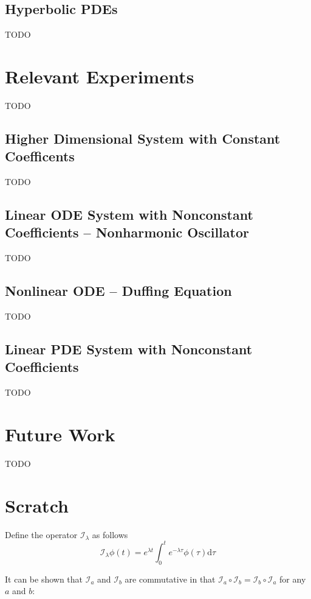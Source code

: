 \documentclass{article}
\newcommand{\I}{\mathcal{I}}
\begin{document}
\subsection{Hyperbolic PDEs}
    TODO

\section{Relevant Experiments}\label{section:experiments}
    TODO

\subsection{Higher Dimensional System with Constant Coefficents} \label{section:high-dimension}
    TODO

\subsection{Linear ODE System with Nonconstant Coefficients -- Nonharmonic Oscillator} \label{section:experiment-nonharmonic-oscillator}
    TODO

\subsection{Nonlinear ODE -- Duffing Equation} \label{section:experiment-duffing}
    TODO

\subsection{Linear PDE System with Nonconstant Coefficients } \label{section:experiment-attractor}
    TODO

\section{Future Work}
    TODO

\printbibliography

\appendix

\section*{Scratch}
    Define the operator $\I_\lambda$ as follows
    \begin{equation}
        \I_\lambda \phi(t) = e^{\lambda t} \int_{0}^{t} e^{-\lambda \tau} \phi(\tau) \mathrm{d}\tau
    \end{equation}

    It can be shown that $\I_a$ and $\I_b$ are commutative in that $\I_a \circ \I_b = \I_b \circ \I_a$ for any $a$ and $b$:
\end{document}
